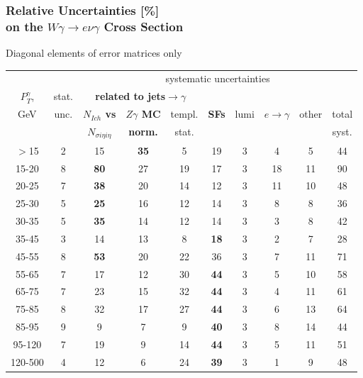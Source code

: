 \begin{frame}\frametitle{Relative Uncertainties [\%]\\
  on the $W\gamma\rightarrow e\nu\gamma$ Cross Section}
\footnotesize
Diagonal elements of error matrices only
\begin{table}[h]
  \tiny
  \begin{center}
   \begin{tabular}{|c|c|c|c|c|c|c|c|c|c|}
   \hline
                  &       & \multicolumn{8}{|c|}{systematic uncertainties}     \\
    $P_T^{\gamma}$, & stat. & \multicolumn{3}{|c|}{\color{blue}\bfseries{related to jets$\rightarrow\gamma$}} &  &  &  &  & \\
    GeV           & unc.  & {\color{blue}\bfseries{$N_{Ich}$ vs}}          &{\color{blue}\bfseries{$Z\gamma$ MC}} & templ. & {\color{blue}\bfseries{SFs}} & lumi &$e\rightarrow\gamma$ & other & total\\ 
                  &       & {\color{blue}\bfseries{$N_{\sigma{i\eta i\eta}}$}} & {\color{blue}\bfseries{norm.}}       & stat.  &  &  & &  & syst.\\ \hline
    $>$15  & 2 & 15 & {\color{blue}\bfseries{35}} & 5 & 19 & 3 & 4 & 5 & 44 \\ \hline
    15-20 & 8 & {\color{blue}\bfseries{80}} & 27 & 19 & 17 & 3 & 18 & 11 & 90 \\ \hline
    20-25 & 7 & {\color{blue}\bfseries{38}} & 20 & 14 & 12 & 3 & 11 & 10 & 48 \\ \hline
    25-30 & 5 & {\color{blue}\bfseries{25}} & 16 & 12 & 14 & 3 & 8 & 8 & 36 \\ \hline
    30-35 & 5 & {\color{blue}\bfseries{35}} & 14 & 12 & 14 & 3 & 3 & 8 & 42 \\ \hline
    35-45 & 3 & 14 & 13 & 8 & {\color{blue}\bfseries{18}} & 3 & 2 & 7 & 28 \\ \hline
    45-55 & 8 & {\color{blue}\bfseries{53}} & 20 & 22 & 36 & 3 & 7 & 11 & 71 \\ \hline
    55-65 & 7 & 17 & 12 & 30 & {\color{blue}\bfseries{44}} & 3 & 5 & 10 & 58 \\ \hline
    65-75 & 7 & 23 & 15 & 32 & {\color{blue}\bfseries{44}} & 3 & 4 & 11 & 61 \\ \hline
    75-85 & 8 & 32 & 17 & 27 & {\color{blue}\bfseries{44}} & 3 & 6 & 13 & 64 \\ \hline
    85-95 & 9 & 9 & 7 & 9 & {\color{blue}\bfseries{40}} & 3 & 8 & 14 & 44 \\ \hline
    95-120 & 7 & 19 & 9 & 14 & {\color{blue}\bfseries{44}} & 3 & 5 & 11 & 51 \\ \hline
    120-500 & 4 & 12 & 6 & 24 & {\color{blue}\bfseries{39}} & 3 & 1 & 9 & 48 \\ \hline
  \end{tabular}
  \label{tab:systInPercent_ELECTRON_WGamma}
  \end{center}
\end{table}
\end{frame}%
